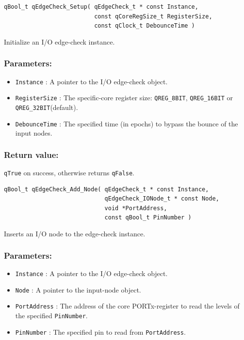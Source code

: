 \documentclass{article}
\begin{document}
\begin{lstlisting}[style=CStyle]
qBool_t qEdgeCheck_Setup( qEdgeCheck_t * const Instance, 
                          const qCoreRegSize_t RegisterSize,
                          const qClock_t DebounceTime )
\end{lstlisting}

Initialize an I/O edge-check instance. 

\subsubsection*{Parameters:}
\begin{itemize}
    \item \lstinline{Instance} : A pointer to the I/O edge-check object.
    \item \lstinline{RegisterSize} : The specific-core register size: \lstinline{QREG_8BIT}, \lstinline{QREG_16BIT} or \lstinline{QREG_32BIT}(default).
    \item \lstinline{DebounceTime} : The specified time (in epochs) to bypass the bounce of the input nodes.
\end{itemize}

\subsubsection*{Return value:}
\lstinline{qTrue} on success, otherwise returns \lstinline{qFalse}.

\noindent\hrulefill

\begin{lstlisting}[style=CStyle]
qBool_t qEdgeCheck_Add_Node( qEdgeCheck_t * const Instance, 
                             qEdgeCheck_IONode_t * const Node, 
                             void *PortAddress, 
                             const qBool_t PinNumber )
\end{lstlisting}

Inserts an I/O node to the edge-check instance. 

\subsubsection*{Parameters:}
\begin{itemize}
    \item \lstinline{Instance} : A pointer to the I/O edge-check object.
    \item \lstinline{Node} :  A pointer to the input-node object.
    \item \lstinline{PortAddress} : The address of the core PORTx-register to read the levels of the specified \lstinline{PinNumber}.
    \item \lstinline{PinNumber} : The specified pin to read from \lstinline{PortAddress}.
\end{itemize}
\end{document}
